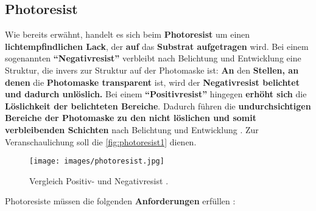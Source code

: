 \documentclass{article} %
\begin{document}


\vspace{1em}

\subsection{Photoresist}

Wie bereits erwähnt, handelt es sich beim \textbf{Photoresist} um einen \textbf{lichtempfindlichen Lack}, der \textbf{auf} das \textbf{Substrat aufgetragen} wird. Bei einem sogenannten \textbf{``Negativresist''} verbleibt nach Belichtung und Entwicklung eine Struktur, die invers zur Struktur auf der Photomaske ist: \textbf{An} den \textbf{Stellen, an denen} die \textbf{Photomaske transparent} ist, wird der \textbf{Negativresist belichtet und dadurch unlöslich.} Bei einem \textbf{``Positivresist''} hingegen \textbf{erhöht sich} die \textbf{Löslichkeit der belichteten Bereiche}. Dadurch führen die \textbf{undurchsichtigen Bereiche der Photomaske zu den nicht löslichen und somit verbleibenden Schichten} nach Belichtung und Entwicklung \cite{gerald2006}. Zur Veranschaulichung soll die \autoref{fig:photoresist1} dienen.

\begin{figure}[htb!]
    \centering
    \texttt{[image: images/photoresist.jpg]} %
    \captionsetup{labelfont=bf} %
    \caption{Vergleich Positiv- und Negativresist \cite{sciencedirect_photoresist}.}
    \label{fig:photoresist1}
\end{figure}

\vspace{1em}

Photoresiste müssen die folgenden \textbf{Anforderungen} erfüllen \cite{schmid2024}:
\end{document}
